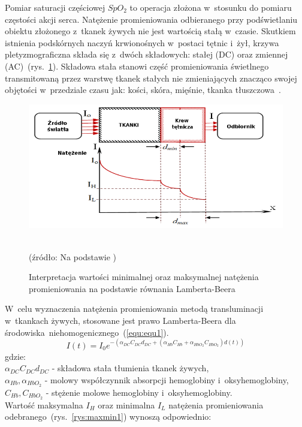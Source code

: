 Pomiar saturacji częściowej $SpO_{2}$ to operacja złożona w~stosunku do pomiaru częstości akcji serca. Natężenie promieniowania odbieranego przy podświetlaniu obiektu złożonego z~tkanek
żywych nie jest wartością stałą w~czasie. Skutkiem istnienia podskórnych naczyń krwionośnych w~postaci tętnic i~żył, krzywa pletyzmograficzna składa się z~dwóch składowych: stałej (DC) oraz zmiennej 
(AC)~(rys.~\ref{rys:maxmin2}). Składowa stała stanowi część promieniowania świetlnego transmitowaną przez warstwę tkanek stałych nie zmieniających znacząco swojej objętości w~przedziale czasu jak: 
kości, skóra, mięśnie, tkanka tłuszczowa~\cite{Fuzzy:2011}.
\begin{figure}[!h]
\centerline{\includegraphics[scale = 0.50]{graphic/maxmin2.png}}
	\caption{Interpretacja wartości minimalnej oraz maksymalnej natężenia promieniowania na podstawie równania Lamberta-Beera}
	\label{rys:maxmin2}
	~\\
	(źródło: Na podstawie \cite{Dwyer:2008})
\end{figure}

W~celu wyznaczenia natężenia promieniowania metodą transluminacji w~tkankach żywych, stosowane jest prawo Lamberta-Beera dla środowiska~niehomogenicznego~(\ref{equ:equ1}).
\begin{equation}
\label{equ:equ1}
	I(t)=I_{0}e^{-(\alpha_{DC}C_{DC}d_{DC}+(\alpha_{Hb}C_{Hb}+\alpha_{HbO_{2}}C_{HbO_{2}})d(t))}
\end{equation}
gdzie:\\
$\alpha_{DC}C_{DC}d_{DC}$ - składowa stała tłumienia tkanek żywych,\\
$\alpha_{Hb}, \alpha_{HbO_{2}}$ - molowy współczynnik absorpcji hemoglobiny i~oksyhemoglobiny,
$C_{Hb}, C_{HbO_{2}}$ - stężenie molowe hemoglobiny i~oksyhemoglobiny.\\

\noindent Wartość maksymalna $I_{H}$ oraz minimalna $I_{L}$ natężenia promieniowania odebranego~(rys.~\ref{rys:maxmin1}) wynoszą odpowiednio:
 
